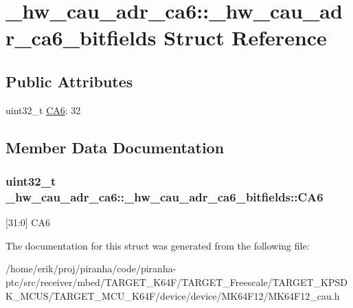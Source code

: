 \hypertarget{struct__hw__cau__adr__ca6_1_1__hw__cau__adr__ca6__bitfields}{}\section{\+\_\+hw\+\_\+cau\+\_\+adr\+\_\+ca6\+:\+:\+\_\+hw\+\_\+cau\+\_\+adr\+\_\+ca6\+\_\+bitfields Struct Reference}
\label{struct__hw__cau__adr__ca6_1_1__hw__cau__adr__ca6__bitfields}
\subsection*{Public Attributes}
\begin{DoxyCompactItemize}
\item 
uint32\+\_\+t \hyperlink{struct__hw__cau__adr__ca6_1_1__hw__cau__adr__ca6__bitfields_a4440eb2543b724621c8a0d3dcb0486c8}{C\+A6}\+: 32
\end{DoxyCompactItemize}


\subsection{Member Data Documentation}
\subsubsection[{\texorpdfstring{C\+A6}{CA6}}]{\setlength{\rightskip}{0pt plus 5cm}uint32\+\_\+t \+\_\+hw\+\_\+cau\+\_\+adr\+\_\+ca6\+::\+\_\+hw\+\_\+cau\+\_\+adr\+\_\+ca6\+\_\+bitfields\+::\+C\+A6}\hypertarget{struct__hw__cau__adr__ca6_1_1__hw__cau__adr__ca6__bitfields_a4440eb2543b724621c8a0d3dcb0486c8}{}\label{struct__hw__cau__adr__ca6_1_1__hw__cau__adr__ca6__bitfields_a4440eb2543b724621c8a0d3dcb0486c8}
\mbox{[}31\+:0\mbox{]} C\+A6 

The documentation for this struct was generated from the following file\+:\begin{DoxyCompactItemize}
\item 
/home/erik/proj/piranha/code/piranha-\/ptc/src/receiver/mbed/\+T\+A\+R\+G\+E\+T\+\_\+\+K64\+F/\+T\+A\+R\+G\+E\+T\+\_\+\+Freescale/\+T\+A\+R\+G\+E\+T\+\_\+\+K\+P\+S\+D\+K\+\_\+\+M\+C\+U\+S/\+T\+A\+R\+G\+E\+T\+\_\+\+M\+C\+U\+\_\+\+K64\+F/device/device/\+M\+K64\+F12/M\+K64\+F12\+\_\+cau.\+h\end{DoxyCompactItemize}
